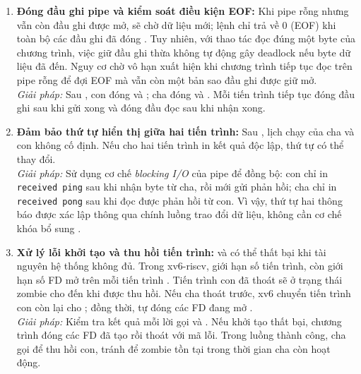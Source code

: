\begin{enumerate}[noitemsep, topsep=2pt]
    \item \textbf{Đóng đầu ghi pipe và kiểm soát điều kiện EOF:}
    Khi pipe rỗng nhưng vẫn còn đầu ghi được mở,  sẽ chờ
    dữ liệu mới; lệnh chỉ trả về 0 (EOF) khi toàn bộ các đầu ghi đã đóng
    \cite{xv6book,xv6pipe}.
    Tuy nhiên, với thao tác đọc đúng một byte của chương trình, việc giữ
    đầu ghi thừa không tự động gây deadlock nếu byte dữ liệu đã đến.
    Nguy cơ chờ vô hạn xuất hiện khi chương trình tiếp tục đọc trên pipe
    rỗng để đợi EOF mà vẫn còn một bản sao đầu ghi được giữ mở.\\
    \textit{Giải pháp:}
    Sau , con đóng  và
    ; cha đóng 
    và .
    Mỗi tiến trình tiếp tục đóng đầu ghi sau khi gửi xong và đóng đầu
    đọc sau khi nhận xong.

    \item \textbf{Đảm bảo thứ tự hiển thị giữa hai tiến trình:}
    Sau , lịch chạy của cha và con không cố định.
    Nếu cho hai tiến trình in kết quả độc lập, thứ tự có thể thay đổi.\\
    \textit{Giải pháp:}
    Sử dụng cơ chế \textit{blocking I/O} của pipe để đồng bộ:
    con chỉ in \texttt{received ping} sau khi nhận byte từ cha,
    rồi mới gửi phản hồi; cha chỉ in \texttt{received pong} sau khi
    đọc được phản hồi từ con.
    Vì vậy, thứ tự hai thông báo được xác lập thông qua chính luồng
    trao đổi dữ liệu, không cần cơ chế khóa bổ sung
    \cite{xv6book,mitxv6util2024}.

    \item \textbf{Xử lý lỗi khởi tạo và thu hồi tiến trình:}
     và  có thể thất bại khi tài nguyên hệ thống
    không đủ. Trong xv6-riscv,  giới hạn số tiến trình,
    còn  giới hạn số FD mở trên mỗi tiến trình
    \cite{xv6param}.
    Tiến trình con đã thoát sẽ ở trạng thái zombie cho đến khi được
    thu hồi. Nếu cha thoát trước, xv6 chuyển tiến trình con còn lại
    cho ; đồng thời,  tự đóng các FD đang mở
    \cite{xv6book,xv6proc}.\\
    \textit{Giải pháp:}
    Kiểm tra kết quả mỗi lời gọi  và .
    Nếu khởi tạo thất bại, chương trình đóng các FD đã tạo rồi thoát
    với mã lỗi. Trong luồng thành công, cha gọi  để thu hồi
    con, tránh để zombie tồn tại trong thời gian cha còn hoạt động.
\end{enumerate}

